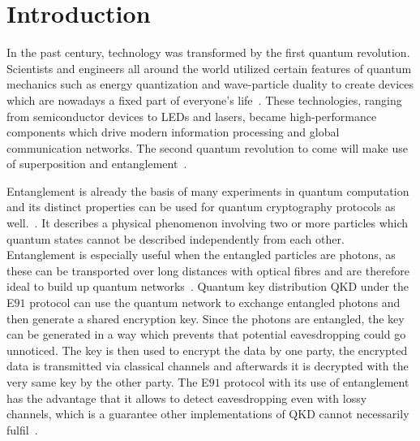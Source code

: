 \chapter{Introduction}

In the past century, technology was transformed by the first quantum revolution. Scientists and engineers all around the world utilized certain features of quantum mechanics such as energy quantization and wave-particle duality to create devices which are nowadays a fixed part of everyone's life~\cite{aharonovich_solid-state_2016}.
These technologies, ranging from semiconductor devices to LEDs and lasers, became high-performance components which drive modern information processing and global communication networks.
The second quantum revolution to come will make use of superposition and entanglement~\cite{macfarlane_quantum_2003}.

Entanglement is already the basis of many experiments in quantum computation and its distinct properties can be used for quantum cryptography protocols as well.~\cite{zeilinger_light_2017}.
It describes a physical phenomenon involving two or more particles which quantum states cannot be described independently from each other.
Entanglement is especially useful when the entangled particles are photons, as these can be transported over long distances with optical fibres and are therefore ideal to build up quantum networks~\cite{gisin_quantum_2002}.
Quantum key distribution \acs{QKD}  under the E$91$ protocol can use the quantum network to exchange entangled photons and then generate a shared encryption key.
Since the photons are entangled, the key can be generated in a way which prevents that potential eavesdropping could go unnoticed.
The key is then used to encrypt the data by one party, the encrypted data is transmitted via classical channels and afterwards it is decrypted with the very same key by the other party.
The E$91$ protocol with its use of entanglement has the advantage that it allows to detect eavesdropping even with lossy channels, which is a guarantee other implementations of \ac{QKD} cannot necessarily fulfil~\cite{ekert_quantum_1991}.

